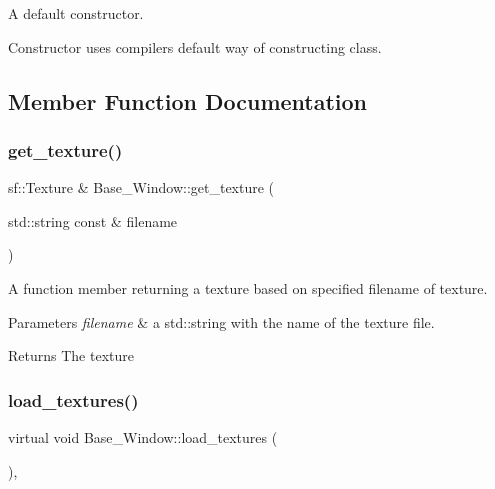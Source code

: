 A default constructor. 

Constructor uses compiler\textquotesingle{}s default way of constructing class. 

\subsection{Member Function Documentation}
\mbox{\label{classBase__Window_a7795a731d3e0dba029219b0d81954dfc}} 
\subsubsection{\texorpdfstring{get\+\_\+texture()}{get\_texture()}}
{\footnotesize\ttfamily sf\+::\+Texture \& Base\+\_\+\+Window\+::get\+\_\+texture (\begin{DoxyParamCaption}\item[{std\+::string const \&}]{filename }\end{DoxyParamCaption})\hspace{0.3cm}{\ttfamily [protected]}}



A function member returning a texture based on specified filename of texture. 


\begin{DoxyParams}{Parameters}
{\em filename} & a std\+::string with the name of the texture file. \\
\hline
\end{DoxyParams}
\begin{DoxyReturn}{Returns}
The texture 
\end{DoxyReturn}
\mbox{\label{classBase__Window_a0d0e107e9eb19bd74b25f4465688e862}} 
\subsubsection{\texorpdfstring{load\+\_\+textures()}{load\_textures()}}
{\footnotesize\ttfamily virtual void Base\+\_\+\+Window\+::load\+\_\+textures (\begin{DoxyParamCaption}{ }\end{DoxyParamCaption})\hspace{0.3cm}{\ttfamily [protected]}, {}}



